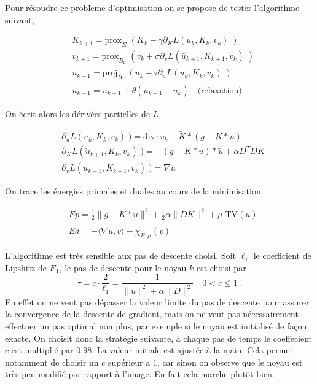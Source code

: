 \documentclass[a4paper]{article}
\begin{document}
Pour résoudre ce probleme d'optimisation on se propose de tester l'algorithme suivant,


\begin{align}
& K_{k+1} = \text{prox}_{\Sigma} \; (K_k - \gamma \partial_K L(u_k,K_k,v_k) \; )\\
& v_{k+1}         = \text{prox}_{B_\mu} \; (v_k + \sigma \partial_v L (\bar{u}_{k+1},K_{k+1},v_k) \; )\\
& u_{k+1} = \text{proj}_{B_1} \; (u_k - \tau \partial_u L(u_k,K_k,v_k) \; )\\
&\bar{u}_{k+1} = u_{k+1} + \theta (u_{k+1} - u_k) \quad \text{(relaxation)}
\end{align}


On écrit alors les dérivées partielles de $L$,

\begin{align}
& \partial_u L(u_k,K_k,v_k) \; ) = \text{div} \cdot v_k - \tilde{K} * (g-K*u)\\
& \partial_K L(\tilde{u}_{k+1},K_k,v_k) \; ) = - (g-K*u)*\tilde{u} + \alpha D^TDK \\
& \partial_v L (u_{k+1},K_{k+1},v_k) \; ) =  \nabla u
\end{align}


On trace les énergies primales et duales au cours de la minimisation

\begin{align}
& Ep = \frac{1}{2} \| g - K * u\|^2 
+ \frac{1}{2} \alpha \| D K \|^2
+ \mu. \text{TV} (u) \\
\\
& Ed = - \langle \nabla u ,v \rangle - \chi_{B,\mu}(v)
\end{align}

L'algorithme est très sensible aux pas de descente choisi.
Soit $\ell_1$ le coefficient de Lipshitz de $E_1$, le pas de descente pour le noyau $k$
est choisi par
\[
\tau = c \cdot \frac{2}{\ell_1} = \frac{1}{\|u\|^2 + \alpha \|D\|^2} \quad 0<c \leq 1 \; .
\]
En effet on ne veut pas dépasser la valeur limite du pas de descente pour assurer la convergence de la descente de gradient, mais on ne veut pas nécessairement effectuer un pas optimal non plus, par exemple si le noyau est initialisé de façon exacte.
On choisit donc la stratégie suivante, à chaque pas de temps le coeffecient $c$ est multiplié par $0.98$. La valeur initiale est ajustée à la main. Cela permet notamment de choisir un $c$ supérieur a $1$, car sinon on observe que le noyau est très peu modifié par rapport à l'image.
En fait cela marche plutôt bien.
\end{document}
